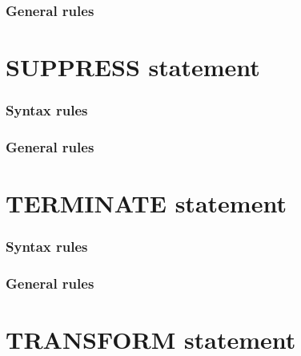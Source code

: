 \subsubsection{General rules}

\section{SUPPRESS statement}

\begin{syntax}
\end{syntax}

\subsubsection{Syntax rules}

\subsubsection{General rules}

\section{TERMINATE statement}

\begin{syntax}
\end{syntax}

\subsubsection{Syntax rules}

\subsubsection{General rules}

\section{TRANSFORM statement}

\begin{syntax}[\deletedcolour]
   \identifier {}
  \begin{1=}
    \identifier \\
    \literal
  \end{1=}
  \begin{1=}
    \identifier \\
    \literal
  \end{1=}
\end{syntax}

